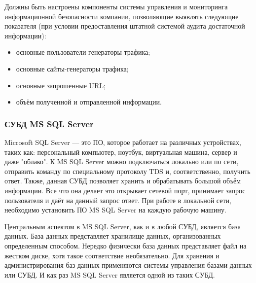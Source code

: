 Должны быть настроены компоненты системы управления и мониторинга информационной безопасности компании, позволяющие выявлять следующие показателя (при условии предоставления штатной системой аудита достаточной информации):
\begin{itemize}
    \item основные пользователи-генераторы трафика;
    \item основные сайты-генераторы трафика;
    \item основные запрошенные URL;
    \item объём полученной и отправленной информации.
\end{itemize}


\subsubsection{СУБД MS SQL Server}
Microsoft SQL Server --- это ПО, которое работает на различных устройствах, таких как: персональный компьютер, ноутбук, виртуальная машина, сервер и даже "облако". К MS SQL Server можно подключаться локально или по сети, отправить команду по специальному протоколу TDS и, соответственно, получить ответ. Также, данная СУБД позволяет хранить и обрабатывать большой объём информации. Все что она делает это открывает сетевой порт, принимает запрос пользователя и даёт на данный запрос ответ. При работе в локальной сети, необходимо установить ПО MS SQL Server на каждую рабочую машину.

Центральным аспектом в MS SQL Server, как и в любой СУБД, является база данных. База данных представляет хранилище данных, организованных определенным способом. Нередко физически база данных представляет файл на жестком диске, хотя такое соответствие необязательно. Для хранения и администрирования баз данных применяются системы управления базами данных или СУБД. И как раз MS SQL Server является одной из таких СУБД.

